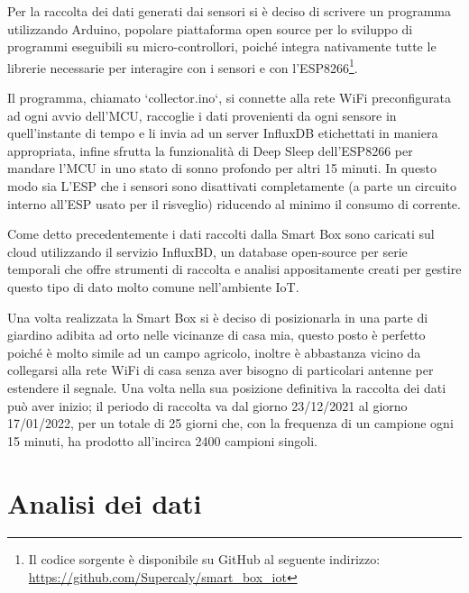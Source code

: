 \documentclass[fleqn, 10pt]{SelfArx}
\begin{document}
Per la raccolta dei dati generati dai sensori si è deciso di scrivere un programma utilizzando Arduino\cite{arduino}, popolare piattaforma open source per lo sviluppo di programmi eseguibili su micro-controllori, poiché 
integra nativamente tutte le librerie necessarie per interagire con i sensori e con l'ESP8266\footnote{Il codice sorgente è disponibile su GitHub al seguente indirizzo: 
\url{https://github.com/Supercaly/smart_box_iot}}. 

Il programma, chiamato `collector.ino`, si connette alla rete WiFi preconfigurata ad ogni avvio dell'MCU, raccoglie i dati provenienti da ogni sensore in quell'instante di tempo e li invia ad un server InfluxDB\cite{influxdb} 
etichettati in maniera appropriata, infine sfrutta la funzionalità di Deep Sleep dell'ESP8266 per mandare l'MCU in uno stato di sonno profondo per altri 15 minuti. In questo modo sia L'ESP che i sensori sono 
disattivati completamente (a parte un circuito interno all'ESP usato per il risveglio) riducendo al minimo il consumo di corrente.

Come detto precedentemente i dati raccolti dalla Smart Box sono caricati sul cloud utilizzando il servizio InfluxBD, un database open-source per serie temporali che offre strumenti di raccolta e analisi appositamente 
creati per gestire questo tipo di dato molto comune nell'ambiente IoT.


Una volta realizzata la Smart Box si è deciso di posizionarla in una parte di giardino adibita ad orto nelle vicinanze di casa mia, questo posto è perfetto poiché è molto simile ad un campo agricolo, 
inoltre è abbastanza vicino da collegarsi alla rete WiFi di casa senza aver bisogno di particolari antenne per estendere il segnale. 
Una volta nella sua posizione definitiva la raccolta dei dati può aver inizio; il periodo di raccolta va dal giorno 23/12/2021 al giorno 17/01/2022, per un totale di 25 giorni che, con la frequenza di un campione 
ogni 15 minuti, ha prodotto all'incirca 2400 campioni singoli.

\section{Analisi dei dati}
\end{document}
